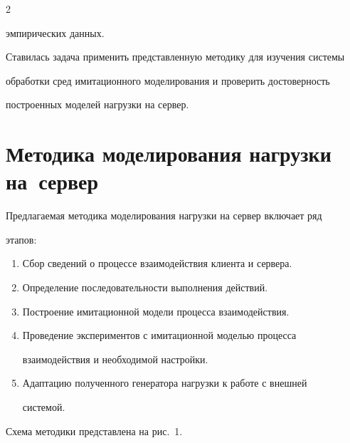 \begin{multicols}{2}
\begin{enumerate}[1.]
эмпирических данных.

\end{enumerate}



  Ставилась задача применить представленную методику для изучения системы 

обработки сред имитационного моделирования и проверить достоверность 

построенных моделей нагрузки на сервер.

  

\section{Методика моделирования нагрузки на~сервер}

  

  Предлагаемая методика моделирования нагрузки на сервер включает ряд 

этапов:

  \begin{enumerate}[1.]

\item Сбор сведений о процессе взаимодействия клиента и сервера.

\item Определение последовательности выполнения действий.

\item Построение имитационной модели процесса взаимодействия.

\item Проведение экспериментов с имитационной моделью процесса 

взаимодействия и необходимой настройки.

\item Адаптацию полученного генератора нагрузки к работе с внешней 

системой.

\end{enumerate}

  

  Схема методики представлена на рис.~1.

  

  \begin{table}[b]\small

\begin{center}


\vspace*{2ex}




\end{center}
\end{table}
\end{multicols}
